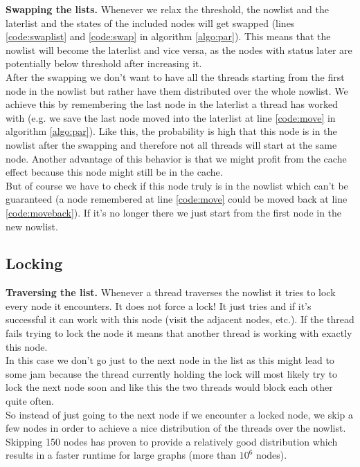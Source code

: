 \documentclass[letterpaper]{article}
\newcommand{\mypar}[1]{{\bf #1.}}
\begin{document}
\mypar{Swapping the lists}
Whenever we relax the threshold, the nowlist and the laterlist and the states of the included nodes will get swapped (lines \ref{code:swaplist} and \ref{code:swap} in algorithm \ref{algo:par}). This means that the nowlist will become the laterlist and vice versa, as the nodes with status later are potentially below threshold after increasing it.\\
After the swapping we don't want to have all the threads starting from the first node in the nowlist but rather have them distributed over the whole nowlist. We achieve this by remembering the last node in the laterlist a thread has worked with (e.g. we save the last node moved into the laterlist at line \ref{code:move} in algorithm \ref{algo:par}). Like this, the probability is high that this node is in the nowlist after the swapping and therefore not all threads will start at the same node. Another advantage of this behavior is that we might profit from the cache effect because this node might still be in the cache.\\
But of course we have to check if this node truly is in the nowlist which can't be guaranteed (a node remembered at line \ref{code:move} could be moved back at line \ref{code:moveback}). If it's no longer there we just start from the first node in the new nowlist.

\subsection{Locking}\label{ssec:lock}

\mypar{Traversing the list}
Whenever a thread traverses the nowlist it tries to lock every node it encounters. It does not force a lock! It just tries and if it's successful it can work with this node (visit the adjacent nodes, etc.). If the thread fails trying to lock the node it means that another thread is working with exactly this node.\\
In this case we don't go just to the next node in the list as this might lead to some jam because the thread currently holding the lock will most likely try to lock the next node soon and like this the two threads would block each other quite often.\\
So instead of just going to the next node if we encounter a locked node, we skip a few nodes in order to achieve a nice distribution of the threads over the nowlist. Skipping 150 nodes has proven to provide a relatively good distribution which results in a faster runtime for large graphs (more than $10^6$ nodes).
\end{document}
